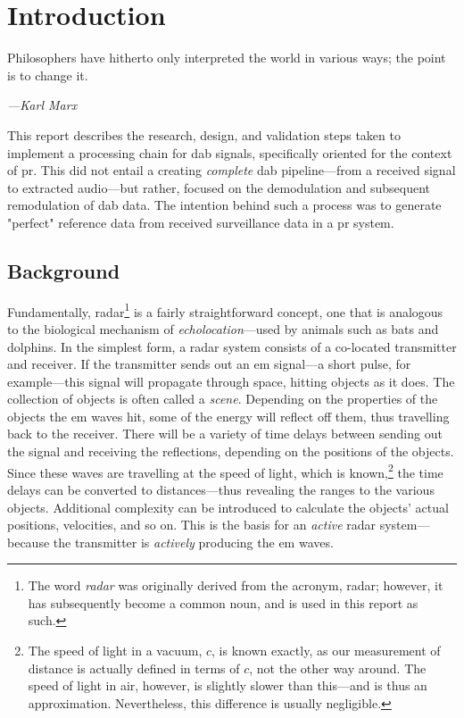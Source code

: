 \documentclass[class=report,11pt,crop=false]{standalone}
\begin{document}
\chapter{Introduction}
\epigraph{Philosophers have hitherto only interpreted the world in various ways; the point is to change it.}%
    {\emph{---Karl Marx}}

This report describes the research, design, and validation steps taken to implement a processing chain for \gls{dab} signals, specifically oriented for the context of \gls{pr}. This did not entail a creating \emph{complete} \gls{dab} pipeline---from a received signal to extracted audio---but rather, focused on the demodulation and subsequent remodulation of \gls{dab} data. The intention behind such a process was to generate "perfect" reference data from received surveillance data in a \gls{pr} system.

\section{Background}
Fundamentally, radar\footnote{The word \emph{radar} was originally derived from the acronym, \acrlong{radar}; however, it has subsequently become a common noun, and is used in this report as such.} is a fairly straightforward concept, one that is analogous to the biological mechanism of \emph{echolocation}---used by animals such as bats and dolphins. In the simplest form, a radar system consists of a co-located transmitter and receiver. If the transmitter sends out an \gls{em} signal---a short pulse, for example---this signal will propagate through space, hitting objects as it does. The collection of objects is often called a \emph{scene}. Depending on the properties of the objects the \gls{em} waves hit, some of the energy will reflect off them, thus travelling back to the receiver. There will be a variety of time delays between sending out the signal and receiving the reflections, depending on the positions of the objects. Since these waves are travelling at the speed of light, which is known,\footnote{The speed of light in a vacuum, \(c\), is known exactly, as our measurement of distance is actually defined in terms of \(c\), not the other way around. The speed of light in air, however, is slightly slower than this---and is thus an approximation. Nevertheless, this difference is usually negligible.} the time delays can be converted to distances---thus revealing the ranges to the various objects. Additional complexity can be introduced to calculate the objects' actual positions, velocities, and so on. This is the basis for an \emph{active} radar system---because the transmitter is \emph{actively} producing the \gls{em} waves.
\end{document}
